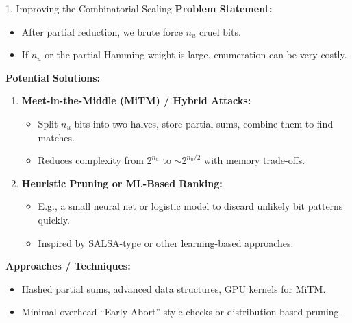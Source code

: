 \documentclass{beamer}
\begin{document}
\begin{frame}{1. Improving the Combinatorial Scaling}
  \textbf{Problem Statement:}
  \begin{itemize}
    \item After partial reduction, we brute force $n_u$ cruel bits. 
    \item If $n_u$ or the partial Hamming weight is large, enumeration can be very costly.
  \end{itemize}

  \textbf{Potential Solutions:}
  \begin{enumerate}
    \item \textbf{Meet-in-the-Middle (MiTM) / Hybrid Attacks:}
      \begin{itemize}
        \item Split $n_u$ bits into two halves, store partial sums, combine them to find matches.
        \item Reduces complexity from $2^{n_u}$ to $\sim 2^{n_u/2}$ with memory trade-offs.
      \end{itemize}
    \item \textbf{Heuristic Pruning or ML-Based Ranking:}
      \begin{itemize}
        \item E.g., a small neural net or logistic model to discard unlikely bit patterns quickly.
        \item Inspired by SALSA-type or other learning-based approaches.
      \end{itemize}
  \end{enumerate}
  
  \textbf{Approaches / Techniques:}
  \begin{itemize}
    \item Hashed partial sums, advanced data structures, GPU kernels for MiTM.
    \item Minimal overhead ``Early Abort'' style checks or distribution-based pruning.
  \end{itemize}
\end{frame}
\end{document}
